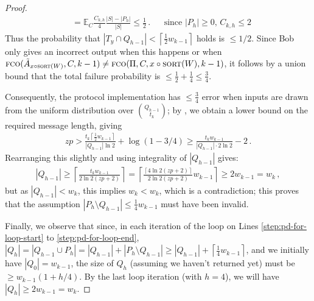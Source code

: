 \documentclass[10pt,a4paper]{article}
\theoremstyle{definition}
\theoremstyle{remark}
\newcommand{\EE}{\mathbb{E}}
\newcommand{\ceil}[1]{{\left\lceil{#1}\right\rceil}}
\newcommand{\fco}{\textsc{fco}\xspace}
\newcommand{\sort}{\textsc{sort}\xspace}
\newcommand{\concat}{\mathbin{\circ}}       %
\begin{document}
\begin{itemize}
\begin{itemize}
\begin{proof}
\begin{align*}
      &= \EE_C \frac{C_{k,h}}{4} \frac{|S|-|P_h|}{|S|} \le \frac{1}{2} \,. &&\text{since $|P_h|\ge 0$, $C_{k,h} \le 2$} 
  \end{align*}
  Thus the probability that $|T_y \cap Q_{h-1}| < \ceil{\frac{1}{2} w_{k-1}}$
  holds is $\le 1/2$. Since Bob only gives an incorrect output when this
  happens or when $\fco(\tilde{A}_{x \concat \sort(W)}, C, k-1) \ne
  \fco(\Pi, C, x \concat \sort(W), k-1)$, it follows by a union bound that
  the total failure probability is $\le \frac{1}{2} + \frac{1}{4} \le
  \frac{3}{4}$.
  
  Consequently, the protocol implementation has $\le \frac{3}{4}$ error when inputs are drawn from the uniform distribution over $\binom{Q_{h-1}}{t_k}$; by , we 
  obtain a lower bound on the required message length, giving
  \begin{align*}
    z p > \frac{t_k \ceil{\frac{1}{2} w_{k-1}}}{|Q_{h-1}| \ln 2} + \log(1 - 3/4) \ge \frac{t_k w_{k-1}}{|Q_{h-1}| \cdot 2 \ln  2} - 2 \,.
  \end{align*}
  Rearranging this slightly and using integrality of $|Q_{h-1}|$ gives:
  \begin{align*}
    |Q_{h-1}| \ge \ceil{\frac{t_k w_{k-1}}{2 \ln  2 (zp+2) }} = \ceil{\frac{\ceil{4 \ln 2 (zp + 2)}}{2 \ln  2 (zp+2) } w_{k-1}} \ge 2 w_{k-1} = w_k \,,
  \end{align*}
  but as $|Q_{h-1}| < w_k$, this implies $w_k < w_k$, which is a
  contradiction; this proves that the assumption $|P_h \setminus Q_{h-1}| \le
  \frac{1}{4} w_{k-1}$ must have been invalid.
  
  Finally, we observe that since, in each iteration of the loop on Lines \ref{step:pd-for-loop-start} to \ref{step:pd-for-loop-end},
  $|Q_h| = |Q_{h-1} \cup P_{h}| = |Q_{h-1}| + |P_{h} \setminus Q_{h-1}| \ge |Q_{h-1}| + \ceil{\frac{1}{4} w_{k-1}}$,
  and we initially have $|Q_0| = w_{k-1}$, the size of $Q_h$ (assuming we haven't returned yet)
  must be $\ge w_{k-1} (1 + h / 4)$. By the last loop iteration (with $h=4$), we will have $|Q_h| \ge 2 w_{k-1} = w_k$.
\end{proof}



\end{itemize}
\end{itemize}
\end{document}
